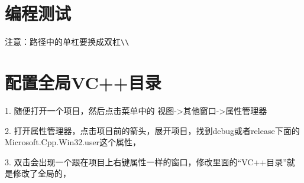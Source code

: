 \documentclass[UTF8,a4paper,8pt]{ctexart}
\begin{document}
\section{编程测试}注意：路径中的单杠要换成双杠\verb|\\|

\section{配置全局VC++目录}
	
	1. 随便打开一个项目，然后点击菜单中的 视图->其他窗口->属性管理器
	
	2. 打开属性管理器，点击项目前的箭头，展开项目，找到debug或者release下面的Microsoft.Cpp.Win32.user这个属性，
	
	3. 双击会出现一个跟在项目上右键属性一样的窗口，修改里面的“VC++目录”就是修改了全局的，
\end{document}

